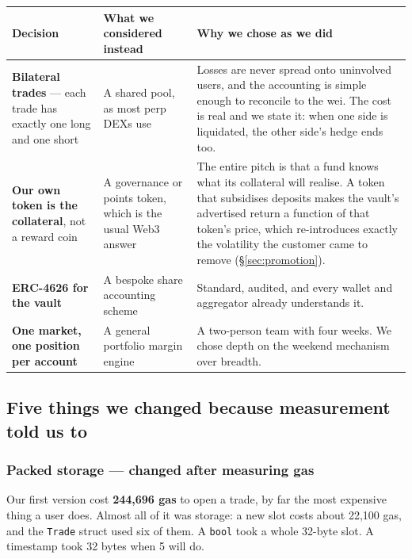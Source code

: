 \documentclass[11pt,a4paper]{article}
\begin{document}
\begin{center}
\small
\begin{tabular}{@{}p{3.4cm}p{5.6cm}p{6.4cm}@{}}
\toprule
\textbf{Decision} & \textbf{What we considered instead} & \textbf{Why we chose as we did} \\
\midrule
\textbf{Bilateral trades} — each trade has exactly one long and one short &
A shared pool, as most perp DEXs use &
Losses are never spread onto uninvolved users, and the accounting is simple enough to reconcile to
the wei. The cost is real and we state it: when one side is liquidated, the other side's hedge ends
too. \\

\textbf{Our own token is the collateral}, not a reward coin &
A governance or points token, which is the usual Web3 answer &
The entire pitch is that a fund knows what its collateral will realise. A token that subsidises
deposits makes the vault's advertised return a function of that token's price, which re-introduces
exactly the volatility the customer came to remove (\S\ref{sec:promotion}). \\

\textbf{ERC-4626 for the vault} &
A bespoke share accounting scheme &
Standard, audited, and every wallet and aggregator already understands it. \\

\textbf{One market, one position per account} &
A general portfolio margin engine &
A two-person team with four weeks. We chose depth on the weekend mechanism over breadth. \\
\bottomrule
\end{tabular}
\end{center}

\subsection{Five things we changed because measurement told us to}

\subsubsection{Packed storage — changed after measuring gas}

Our first version cost \textbf{244,696 gas} to open a trade, by far the most expensive thing a user
does. Almost all of it was storage: a new slot costs about 22,100 gas, and the \texttt{Trade} struct
used six of them. A \texttt{bool} took a whole 32-byte slot. A timestamp took 32 bytes when 5 will
do.
\end{document}
